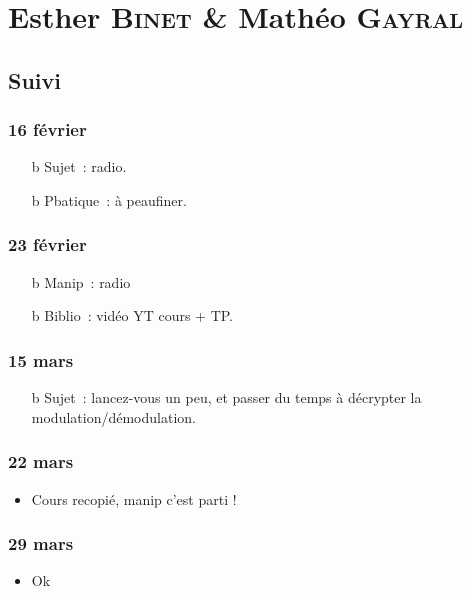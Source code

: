 \documentclass[a4paper, 11pt, final, garamond]{book}
\begin{document}
\chapter{Esther \textsc{Binet} \& Mathéo \textsc{Gayral}}
\label{ch:binetgayral}

\section{Suivi}
\subsection{16 février}
\begin{itemize}
	\item[b]{Sujet}~: radio.
	\item[b]{Pbatique}~: à peaufiner.
\end{itemize}

\subsection{23 février}
\begin{itemize}
	\item[b]{Manip}~: radio
	\item[b]{Biblio}~: vidéo YT cours + TP.
\end{itemize}

\subsection{15 mars}
\begin{itemize}
	\item[b]{Sujet}~: lancez-vous un peu, et passer du temps à décrypter la
	modulation/démodulation.
\end{itemize}

\subsection{22 mars}
\begin{itemize}
	\item Cours recopié, manip c'est parti !
\end{itemize}

\subsection{29 mars}
\begin{itemize}
	\item Ok
\end{itemize}
\end{document}
